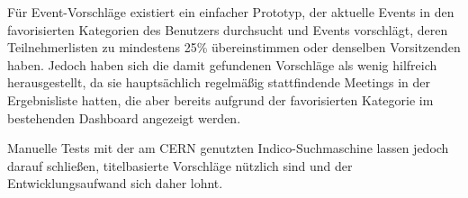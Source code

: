Für Event-Vorschläge existiert ein einfacher Prototyp, der aktuelle Events in den favorisierten
Kategorien des Benutzers durchsucht und Events vorschlägt, deren Teilnehmerlisten zu mindestens 25\%
übereinstimmen oder denselben Vorsitzenden haben. Jedoch haben sich die damit gefundenen Vorschläge
als wenig hilfreich herausgestellt, da sie hauptsächlich regelmäßig stattfindende Meetings in der
Ergebnisliste hatten, die aber bereits aufgrund der favorisierten Kategorie im bestehenden Dashboard
angezeigt werden.

Manuelle Tests mit der am CERN genutzten Indico-Suchmaschine lassen jedoch darauf schließen,
titelbasierte Vorschläge nützlich sind und der Entwicklungsaufwand sich daher lohnt.

